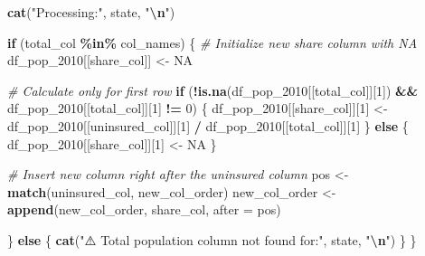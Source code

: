 \documentclass[
]{article}
\newenvironment{Shaded}{\begin{snugshade}}{\end{snugshade}}
\newcommand{\AttributeTok}[1]{\textcolor[rgb]{0.13,0.29,0.53}{#1}}
\newcommand{\CommentTok}[1]{\textcolor[rgb]{0.56,0.35,0.01}{\textit{#1}}}
\newcommand{\ConstantTok}[1]{\textcolor[rgb]{0.56,0.35,0.01}{#1}}
\newcommand{\ControlFlowTok}[1]{\textcolor[rgb]{0.13,0.29,0.53}{\textbf{#1}}}
\newcommand{\DecValTok}[1]{\textcolor[rgb]{0.00,0.00,0.81}{#1}}
\newcommand{\FunctionTok}[1]{\textcolor[rgb]{0.13,0.29,0.53}{\textbf{#1}}}
\newcommand{\NormalTok}[1]{#1}
\newcommand{\OtherTok}[1]{\textcolor[rgb]{0.56,0.35,0.01}{#1}}
\newcommand{\SpecialCharTok}[1]{\textcolor[rgb]{0.81,0.36,0.00}{\textbf{#1}}}
\newcommand{\StringTok}[1]{\textcolor[rgb]{0.31,0.60,0.02}{#1}}
\begin{document}
\begin{Shaded}
\begin{Highlighting}[]
  \FunctionTok{cat}\NormalTok{(}\StringTok{"Processing:"}\NormalTok{, state, }\StringTok{"}\SpecialCharTok{\textbackslash{}n}\StringTok{"}\NormalTok{)}
  
  \ControlFlowTok{if}\NormalTok{ (total\_col }\SpecialCharTok{\%in\%}\NormalTok{ col\_names) \{}
    \CommentTok{\# Initialize new share column with NA}
\NormalTok{    df\_pop\_2010[[share\_col]] }\OtherTok{\textless{}{-}} \ConstantTok{NA}
    
    \CommentTok{\# Calculate only for first row}
    \ControlFlowTok{if}\NormalTok{ (}\SpecialCharTok{!}\FunctionTok{is.na}\NormalTok{(df\_pop\_2010[[total\_col]][}\DecValTok{1}\NormalTok{]) }\SpecialCharTok{\&\&}\NormalTok{ df\_pop\_2010[[total\_col]][}\DecValTok{1}\NormalTok{] }\SpecialCharTok{!=} \DecValTok{0}\NormalTok{) \{}
\NormalTok{      df\_pop\_2010[[share\_col]][}\DecValTok{1}\NormalTok{] }\OtherTok{\textless{}{-}}\NormalTok{ df\_pop\_2010[[uninsured\_col]][}\DecValTok{1}\NormalTok{] }\SpecialCharTok{/}\NormalTok{ df\_pop\_2010[[total\_col]][}\DecValTok{1}\NormalTok{]}
\NormalTok{    \} }\ControlFlowTok{else}\NormalTok{ \{}
\NormalTok{      df\_pop\_2010[[share\_col]][}\DecValTok{1}\NormalTok{] }\OtherTok{\textless{}{-}} \ConstantTok{NA}
\NormalTok{    \}}
    
    \CommentTok{\# Insert new column right after the uninsured column}
\NormalTok{    pos }\OtherTok{\textless{}{-}} \FunctionTok{match}\NormalTok{(uninsured\_col, new\_col\_order)}
\NormalTok{    new\_col\_order }\OtherTok{\textless{}{-}} \FunctionTok{append}\NormalTok{(new\_col\_order, share\_col, }\AttributeTok{after =}\NormalTok{ pos)}
    
\NormalTok{  \} }\ControlFlowTok{else}\NormalTok{ \{}
    \FunctionTok{cat}\NormalTok{(}\StringTok{"⚠️ Total population column not found for:"}\NormalTok{, state, }\StringTok{"}\SpecialCharTok{\textbackslash{}n}\StringTok{"}\NormalTok{)}
\NormalTok{  \}}
\NormalTok{\}}
\end{Highlighting}
\end{Shaded}
\end{document}
